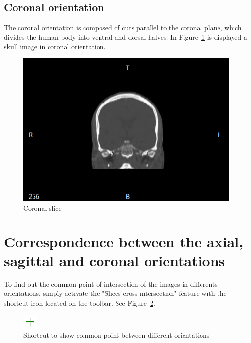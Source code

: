 \newpage

\subsection{Coronal orientation}

The coronal orientation is composed of cuts parallel to the coronal plane, which divides the human body into ventral and dorsal halves.
In Figure~\ref{fig:coronal_slice} is displayed a skull image in coronal orientation.

\begin{figure}[!htb]
\centering
\includegraphics[scale=0.30]{../user_guide_figures/invesalius_screen/coronal_en.png}
\caption{Coronal slice}
\label{fig:coronal_slice}
\end{figure}


\section{Correspondence between the axial, sagittal and coronal orientations}
\label{sec:corresp_all_orient}

To find out the common point of intersection of the images in differents orientations, simply activate the "Slices cross intersection" feature with the shortcut icon located on the toolbar. See Figure~\ref{fig:cross_icon}.

\begin{figure}[!htb]
\centering
\includegraphics[scale=1]{../user_guide_figures/icons/cross.png}
\caption{Shortcut to show common point between different orientations}
\label{fig:cross_icon}
\end{figure}

